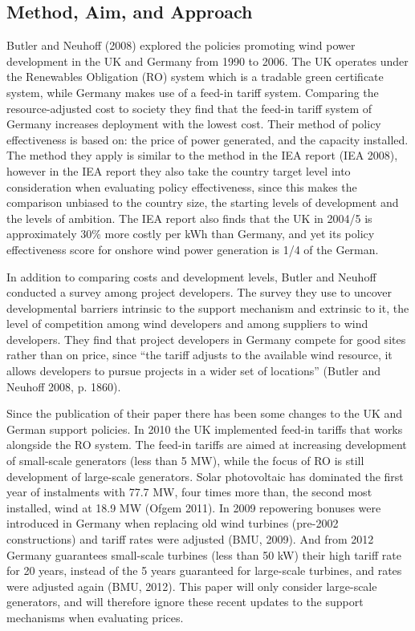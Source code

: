 \documentclass[a4paper, 12pt]{article}
\begin{document}
\subsection{Method, Aim, and Approach}
Butler and Neuhoff (2008) explored the policies promoting wind power development in the UK and Germany from 1990 to 2006. The UK operates under the Renewables Obligation (RO) system which is a tradable green certificate system, while Germany makes use of a feed-in tariff system. Comparing the resource-adjusted cost to society they find that the feed-in tariff system of Germany increases deployment with the lowest cost. Their method of policy effectiveness is based on: the price of power generated, and the capacity installed. The method they apply is similar to the method in the IEA report (IEA 2008), however in the IEA report they also take the country target level into consideration when evaluating policy effectiveness, since this makes the comparison unbiased to the country size, the starting levels of development and the levels of ambition. The IEA report also finds that the UK in 2004/5 is approximately 30\% more costly per kWh than Germany, and yet its policy effectiveness score for onshore wind power generation is 1/4 of the German.

In addition to comparing costs and development levels, Butler and Neuhoff conducted a survey among project developers. The survey they use to uncover developmental barriers intrinsic to the support mechanism and extrinsic to it, the level of competition among wind developers and among suppliers to wind developers. They find that project developers in Germany compete for good sites rather than on price, since ``the tariff adjusts to the available wind resource, it allows developers to pursue projects in a wider set of locations'' (Butler and Neuhoff 2008, p. 1860).

Since the publication of their paper there has been some changes to the UK and German support policies. In 2010 the UK implemented feed-in tariffs that works alongside the RO system. The feed-in tariffs are aimed at increasing development of small-scale generators (less than 5 MW), while the focus of RO is still development of large-scale generators. Solar photovoltaic has dominated the first year of instalments with 77.7 MW, four times more than, the second most installed, wind at 18.9 MW (Ofgem 2011). In 2009 repowering bonuses were introduced in Germany when replacing old wind turbines (pre-2002 constructions) and tariff rates were adjusted (BMU, 2009). And from 2012 Germany guarantees small-scale turbines (less than 50 kW) their high tariff rate for 20 years, instead of the 5 years guaranteed for large-scale turbines, and rates were adjusted again (BMU, 2012). This paper will only consider large-scale generators, and will therefore ignore these recent updates to the support mechanisms when evaluating prices.
\end{document}
